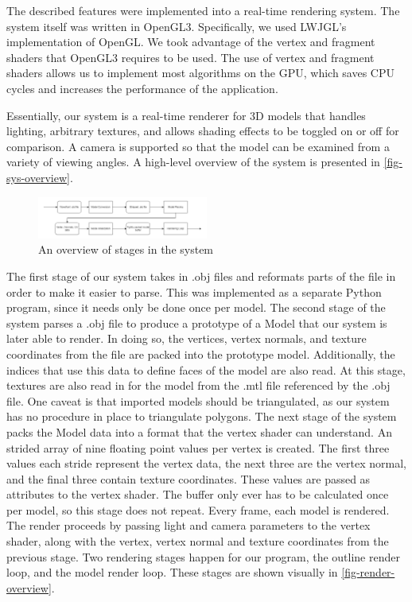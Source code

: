 The described features were implemented into a real-time rendering system. The system itself 
was written in OpenGL3. Specifically, we used LWJGL's implementation of OpenGL. We took advantage
of the vertex and fragment shaders that OpenGL3 requires to be used. The use of vertex and fragment
shaders allows us to implement most algorithms on the GPU, which saves CPU cycles and increases the
performance of the application.

Essentially, our system is a real-time renderer for 3D models that handles lighting, arbitrary
textures, and allows shading effects to be toggled on or off for comparison. A camera is supported
so that the model can be examined from a variety of viewing angles. A high-level overview of the
system is presented in \autoref{fig-sys-overview}.

\begin{figure}[h]
    \centering
    \includegraphics[width=0.5\textwidth]{img/system-overview.png}
    \caption{An overview of stages in the system}
    \label{fig-sys-overview}
\end{figure}

The first stage of our system takes in .obj files and reformats parts of the file in order to make
it easier to parse. This was implemented as a separate Python program, since it needs only be done 
once per model.
The second stage of the system parses a .obj file to produce a prototype of a Model that our system
is later able to render. In doing so, the vertices, vertex normals, and texture coordinates from the
file are packed into the prototype model. Additionally, the indices that use this data to define
faces of the model are also read. At this stage, textures are also read in for the model from the
.mtl file referenced by the  .obj file. One caveat is that imported models should be triangulated,
as our system has no procedure in place to triangulate polygons.
The next stage of the system packs the Model data into a format that the vertex shader can 
understand. An strided array of nine floating point values per vertex is created. The first three
values each stride represent the vertex data, the next three are the vertex normal, and the final 
three contain texture coordinates. These values are passed as attributes to the vertex shader.
The buffer only ever has to be calculated once per model, so this stage does not repeat. 
Every frame, each model is rendered. The render proceeds by passing light and camera parameters to 
the vertex shader, along with the vertex, vertex normal and texture coordinates from the previous 
stage. Two rendering stages happen for our program, the outline render loop, and the model render
loop. These stages are shown visually in \autoref{fig-render-overview}.

